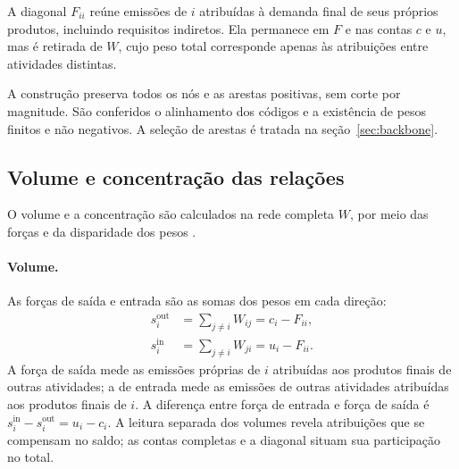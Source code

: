 \documentclass[11pt]{article}
\begin{document}
A diagonal $F_{ii}$ reúne emissões de $i$ atribuídas à demanda final de seus próprios produtos, incluindo requisitos indiretos. Ela permanece em $F$ e nas contas $c$ e $u$, mas é retirada de $W$, cujo peso total corresponde apenas às atribuições entre atividades distintas.

A construção preserva todos os nós e as arestas positivas, sem corte por magnitude. São conferidos o alinhamento dos códigos e a existência de pesos finitos e não negativos. A seleção de arestas é tratada na seção~\ref{sec:backbone}.

\subsection{Volume e concentração das relações}
\label{sec:volume-concentracao}

O volume e a concentração são calculados na rede completa $W$, por meio das forças e da disparidade dos pesos \parencite{huang2019,serrano2009}.

\paragraph{Volume.}
As forças de saída e entrada são as somas dos pesos em cada direção:
\begin{equation}
\begin{aligned}
s_i^{\mathrm{out}}&=\sum_{j\ne i}W_{ij}=c_i-F_{ii},\\
s_i^{\mathrm{in}}&=\sum_{j\ne i}W_{ji}=u_i-F_{ii}.
\end{aligned}
\label{eq:forcas-externas}
\end{equation}
A força de saída mede as emissões próprias de $i$ atribuídas aos produtos finais de outras atividades; a de entrada mede as emissões de outras atividades atribuídas aos produtos finais de $i$. A diferença entre força de entrada e força de saída é $s_i^{\mathrm{in}}-s_i^{\mathrm{out}}=u_i-c_i$. A leitura separada dos volumes revela atribuições que se compensam no saldo; as contas completas e a diagonal situam sua participação no total.
\end{document}
